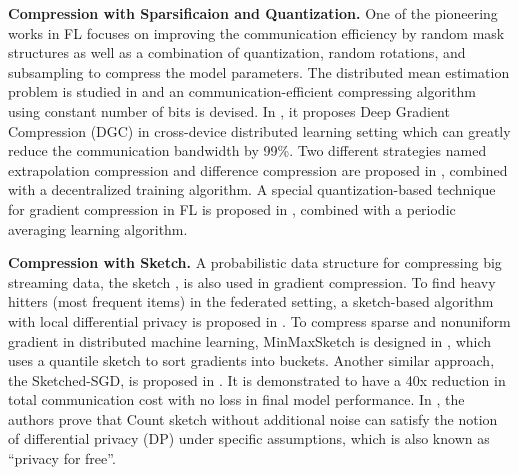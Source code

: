 \documentclass[11pt]{article}
\newcommand{\fakeparagraph}[1]{\vspace{1mm}\noindent\textbf{#1.}}
\begin{document}
\fakeparagraph{Compression with Sparsificaion and Quantization}
One of the pioneering works in FL \cite{DBLP:journals/corr/KonecnyMYRSB16} focuses on improving the communication efficiency by random mask structures as well as a combination of quantization, random rotations, and subsampling to compress the model parameters.
The distributed mean estimation problem is studied in \cite{DBLP:conf/icml/SureshYKM17} and an communication-efficient compressing algorithm using constant number of bits is devised. 
In \cite{DBLP:conf/iclr/LinHM0D18}, it proposes Deep Gradient Compression (DGC) in cross-device distributed learning setting which can greatly reduce the communication bandwidth by 99\%. 
Two different strategies named extrapolation compression and difference compression are proposed in \cite{DBLP:conf/nips/TangGZZL18}, combined with a decentralized training algorithm. 
A special quantization-based technique for gradient compression in FL is proposed in \cite{DBLP:conf/aistats/ReisizadehMHJP20}, combined with a periodic averaging learning algorithm. 

\fakeparagraph{Compression with Sketch}
A probabilistic data structure for compressing big streaming data, the sketch \cite{DBLP:conf/soda/Muthukrishnan03}, is also used in gradient compression.
To find heavy hitters (most frequent items) in the federated setting, a sketch-based algorithm with local differential privacy is proposed in \cite{DBLP:conf/aistats/ZhuKMSL20}.
To compress sparse and nonuniform gradient in distributed machine learning, MinMaxSketch is designed in \cite{DBLP:conf/sigmod/JiangFY018}, which uses a quantile sketch to sort gradients into buckets.
Another similar approach, the Sketched-SGD, is proposed in \cite{DBLP:conf/nips/IvkinRUBSA19}. It is demonstrated to have a 40x reduction in total communication cost with no loss in final model performance.
In \cite{DBLP:journals/corr/abs-1911-00972}, the authors prove that Count sketch without additional noise can satisfy the notion of differential privacy (DP) under specific assumptions, which is also known as ``privacy for free''.
\end{document}
